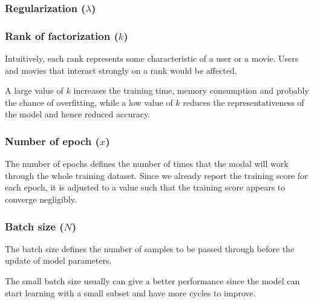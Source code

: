 \documentclass[final]{cvpr}
\begin{document}
\subsubsection{Regularization ($\lambda$)}


\subsubsection{Rank of factorization ($k$)}
Intuitively, each rank represents some characteristic of a user or a movie. Users and movies that interact strongly on a rank would be affected.

A large value of $k$ increases the training time, memory consumption and probably the chance of overfitting,
while a low value of $k$ reduces the representativeness of the model and hence reduced accuracy.

\subsubsection{Number of epoch ($x$)}
The number of epochs defines the number of times that the modal will work through the whole training dataset.
Since we already report the training score for each epoch, it is adjusted to a value such that the training score appears to converge negligibly.


\subsubsection{Batch size ($N$)}
The batch size defines the number of samples to be passed through before the update of model parameters.

The small batch size usually can give a better performance since the model can start learning with a small subset and have more cycles to improve.
\end{document}
